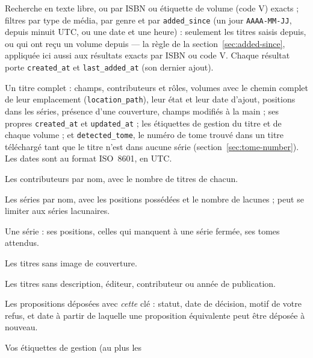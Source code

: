 \begin{description}[style=nextline]
  \item[\texttt{search\_titles}] Recherche en texte libre, ou par ISBN
        ou étiquette de volume (code V) exacts ; filtres par type de
        média, par genre et par \texttt{added\_since} (un jour
        \texttt{AAAA-MM-JJ}, depuis minuit UTC, ou une date et une
        heure) : seulement les titres saisis depuis, ou qui ont reçu un
        volume depuis --- la règle de la section~\ref{sec:added-since},
        appliquée ici aussi aux résultats exacts par ISBN ou code V.
        Chaque résultat porte \texttt{created\_at} et
        \texttt{last\_added\_at} (son dernier ajout).
  \item[\texttt{get\_title}] Un titre complet : champs, contributeurs
        et rôles, volumes avec le chemin complet de leur emplacement
        (\texttt{location\_path}), leur état et leur date d'ajout,
        positions dans les séries, présence d'une couverture, champs
        modifiés à la main ; ses propres \texttt{created\_at} et
        \texttt{updated\_at} ; les étiquettes de gestion du titre et de
        chaque volume ; et \texttt{detected\_tome}, le numéro de tome
        trouvé dans un titre téléchargé tant que le titre n'est dans
        aucune série (section~\ref{sec:tome-number}). Les dates sont au
        format ISO~8601, en UTC.
  \item[\texttt{search\_contributors}] Les contributeurs par nom, avec
        le nombre de titres de chacun.
  \item[\texttt{list\_series}] Les séries par nom, avec les positions
        possédées et le nombre de lacunes ; peut se limiter aux
        séries lacunaires.
  \item[\texttt{get\_series}] Une série : ses positions, celles qui
        manquent à une série fermée, ses tomes attendus.
  \item[\texttt{list\_titles\_without\_cover}] Les titres sans image
        de couverture.
  \item[\texttt{list\_titles\_with\_incomplete\_metadata}] Les titres
        sans description, éditeur, contributeur ou année de
        publication.
  \item[\texttt{list\_my\_proposals}] Les propositions déposées avec
        \emph{cette} clé : statut, date de décision, motif de votre
        refus, et date à partir de laquelle une proposition
        équivalente peut être déposée à nouveau.
  \item[\texttt{list\_labels}] Vos étiquettes de gestion (au plus les

\end{description}
